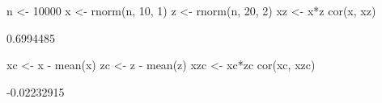 \begin{Schunk}
\begin{Sinput}
 n <- 10000
 x <- rnorm(n, 10, 1)
 z <- rnorm(n, 20, 2)
 xz <- x*z
 cor(x, xz)
\end{Sinput}
\begin{Soutput}
[1] 0.6994485
\end{Soutput}
\begin{Sinput}
 xc <- x - mean(x)
 zc <- z - mean(z)
 xzc <- xc*zc
 cor(xc, xzc)
\end{Sinput}
\begin{Soutput}
[1] -0.02232915
\end{Soutput}
\end{Schunk}
